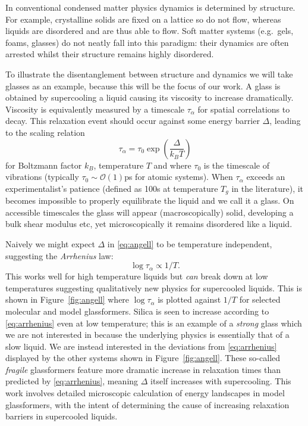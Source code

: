 In conventional condensed matter physics dynamics is determined by structure.
For example, crystalline solids are fixed on a lattice so do not flow, whereas liquids are disordered and are thus able to flow.
Soft matter systems (e.g.\ gels, foams, glasses) do not neatly fall into this paradigm: their dynamics are often arrested whilst their structure remains highly disordered.

To illustrate the disentanglement between structure and dynamics we will take glasses as an example, because this will be the focus of our work.
A glass is obtained by supercooling a liquid causing its viscosity to increase dramatically.
Viscosity is equivalently measured by a timescale $\tau_\alpha$ for spatial correlations to decay.
This relaxation event should occur against some energy barrier $\Delta$, leading to the scaling relation
\begin{equation}\label{eq:angell}
  \tau_\alpha = \tau_0 \exp{\left(\frac{\Delta}{k_B T}\right)}
\end{equation}
for Boltzmann factor $k_B$, temperature $T$ and where $\tau_0$ is the timescale of vibrations (typically $\tau_0 \sim \mathcal{O}(1)$ps for atomic systems).
When $\tau_\alpha$ exceeds an experimentalist's patience (defined as 100s at temperature $T_g$ in the literature), it becomes impossible to properly equilibrate the liquid and we call it a glass.
On accessible timescales the glass will appear (macroscopically) solid, developing a bulk shear modulus etc, yet microscopically it remains disordered like a liquid. 

Naively we might expect $\Delta$ in \eqref{eq:angell} to be temperature independent, suggesting the \emph{Arrhenius} law:
\begin{equation}\label{eq:arrhenius}
  \log{\tau_\alpha} \propto 1/T.
\end{equation}
This works well for high temperature liquids but \emph{can} break down at low temperatures suggesting qualitatively new physics for supercooled liquids.
This is shown in Figure~\ref{fig:angell} where $\log{\tau_\alpha}$ is plotted against $1/T$ for selected molecular and model glassformers.
Silica is seen to increase according to \eqref{eq:arrhenius} even at low temperature; this is an example of a \emph{strong} glass which we are not interested in because the underlying physics is essentially that of a slow liquid.
We are instead interested in the deviations from \eqref{eq:arrhenius} displayed by the other systems shown in Figure~\ref{fig:angell}.
These so-called \emph{fragile} glassformers feature more dramatic increase in relaxation times than predicted by \eqref{eq:arrhenius}, meaning $\Delta$ itself increases with supercooling.
This work involves detailed microscopic calculation of energy landscapes in model glassformers, with the intent of determining the cause of increasing relaxation barriers in supercooled liquids.


